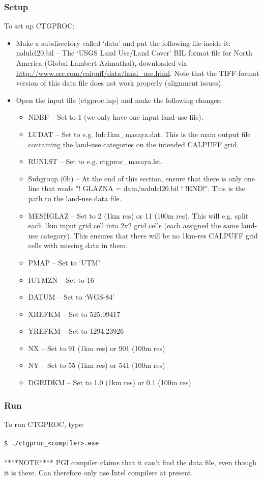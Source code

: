 \documentclass[10pt,a4paper]{article}
\newcommand\tab[1][0.5cm]{\hspace*{#1}}
\begin{document}
\subsubsection{Setup}
To set up CTGPROC:
\begin{itemize}
\item Make a subdirectory called `data' and put the following file inside it:
nalulcl20.bil -- The `USGS Land Use/Land Cover' BIL format file for North America (Global Lambert Azimuthal), downloaded via \url{http://www.src.com/calpuff/data/land_use.html}. Note that the TIFF-format version of this data file does not work properly (alignment issues).
\item Open the input file (ctgproc.inp) and make the following changes:
\begin{itemize}
\item NDBF -- Set to 1 (we only have one input land-use file).
\item LUDAT -- Set to e.g. lulc1km\_masaya.dat. This is the main output file containing the land-use categories on the intended CALPUFF grid.
\item RUNLST -- Set to e.g. ctgproc\_masaya.lst.
\item Subgroup (0b) -- At the end of this section, ensure that there is only one line that reads "! GLAZNA  =  data/nalulcl20.bil !  !END!". This is the path to the land-use data file.
\item MESHGLAZ -- Set to 2 (1km res) or 11 (100m res). This will e.g. split each 1km input grid cell into 2x2 grid cells (each assigned the same land-use category). This ensures that there will be no 1km-res CALPUFF grid cells with missing data in them.
\item PMAP -- Set to `UTM'
\item IUTMZN -- Set to 16
\item DATUM -- Set to `WGS-84'
\item XREFKM -- Set to 525.09417
\item YREFKM -- Set to 1294.23926
\item NX -- Set to 91 (1km res) or 901 (100m res)
\item NY -- Set to 55 (1km res) or 541 (100m res)
\item DGRIDKM -- Set to 1.0 (1km res) or 0.1 (100m res)
\end{itemize}
\end{itemize}

\subsubsection{Run}
To run CTGPROC, type:\\\\
\tab \texttt{\$ ./ctgproc\_<compiler>.exe}\\\\
****NOTE**** PGI compiler claims that it can't find the data file, even though it is there. Can therefore only use Intel compilers at present.
\end{document}
